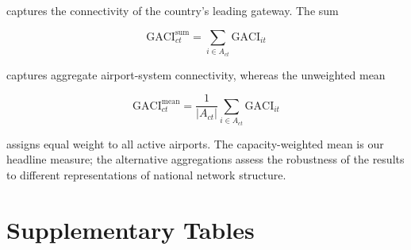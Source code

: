 \documentclass[12pt]{extarticle}
\begin{document}
captures the connectivity of the country's leading gateway. The sum

\begin{equation}
\mathrm{GACI}^{\mathrm{sum}}_{ct}
=
\sum_{i\in A_{ct}}
\mathrm{GACI}_{it}
\label{eq:nature_20}
\end{equation}

captures aggregate airport-system connectivity, whereas the unweighted mean

\begin{equation}
\mathrm{GACI}^{\mathrm{mean}}_{ct}
=
\frac{1}{|A_{ct}|}
\sum_{i\in A_{ct}}
\mathrm{GACI}_{it}
\label{eq:nature_21}
\end{equation}

assigns equal weight to all active airports. The capacity-weighted mean is our headline measure; the alternative aggregations assess the robustness of the results to different representations of national network structure.

\section*{Supplementary Tables}
\setcounter{table}{0}
\renewcommand{\tablename}{Supplementary Table}
\end{document}
